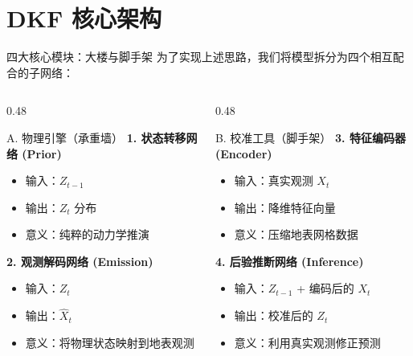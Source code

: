 \documentclass[10pt,aspectratio=1610]{beamer}
\begin{document}
\section{DKF 核心架构}

\begin{frame}{四大核心模块：大楼与脚手架}
    为了实现上述思路，我们将模型拆分为四个相互配合的子网络：
    \vspace{0.3cm}
    \begin{columns}
        \begin{column}{0.48\textwidth}
            \begin{block}{A. 物理引擎（承重墙）}
                \textbf{1. 状态转移网络 (Prior)}
                \begin{itemize}
                    \item 输入：$Z_{t-1}$
                    \item 输出：$Z_t$ 分布
                    \item 意义：纯粹的动力学推演
                \end{itemize}
                \textbf{2. 观测解码网络 (Emission)}
                \begin{itemize}
                    \item 输入：$Z_t$
                    \item 输出：$\hat{X}_t$
                    \item 意义：将物理状态映射到地表观测
                \end{itemize}
            \end{block}
        \end{column}
        \begin{column}{0.48\textwidth}
            \begin{alertblock}{B. 校准工具（脚手架）}
                \textbf{3. 特征编码器 (Encoder)}
                \begin{itemize}
                    \item 输入：真实观测 $X_t$
                    \item 输出：降维特征向量
                    \item 意义：压缩地表网格数据
                \end{itemize}
                \textbf{4. 后验推断网络 (Inference)}
                \begin{itemize}
                    \item 输入：$Z_{t-1}$ + 编码后的 $X_t$
                    \item 输出：校准后的 $Z_t$
                    \item 意义：利用真实观测修正预测
                \end{itemize}
            \end{alertblock}
        \end{column}
    \end{columns}
\end{frame}
\end{document}
